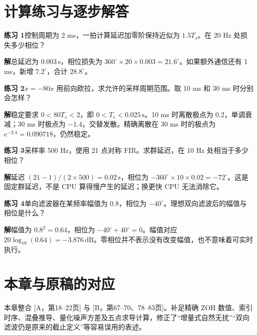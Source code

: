 \section{计算练习与逐步解答}

\textbf{练习 1}\quad 控制周期为 2 ms，一拍计算延迟加零阶保持近似为 $1.5T_s$。在 20 Hz 处损失多少相位？

\textbf{解}\quad 总延迟为 $0.003\,\mathrm{s}$，相位损失为 $360^\circ\times20\times0.003=21.6^\circ$。如果额外通信还有 1 ms，新增 $7.2^\circ$，合计 $28.8^\circ$。

\textbf{练习 2}\quad $\dot x=-80x$ 用前向欧拉，求允许的采样周期范围。取 10 ms 和 30 ms 时分别会怎样？

\textbf{解}\quad 稳定要求 $0<80T_s<2$，即 $0<T_s<0.025\,\mathrm{s}$。10 ms 时离散极点为 0.2，单调衰减；30 ms 时极点为 $-1.4$，交替发散。精确离散在 30 ms 时的极点为 $e^{-2.4}=0.090718$，仍然稳定。

\textbf{练习 3}\quad 采样率 500 Hz，使用 21 点对称 FIR。求群延迟，在 10 Hz 处相当于多少相位？

\textbf{解}\quad 延迟 $(21-1)/(2\times500)=0.02\,\mathrm{s}$，相位为 $-360^\circ\times10\times0.02=-72^\circ$。这是固定群延迟，不是 CPU 算得慢产生的延迟；换更快 CPU 无法消除它。

\textbf{练习 4}\quad 单向滤波器在某频率幅值为 0.8，相位为 $-40^\circ$。理想双向滤波后的幅值与相位是什么？

\textbf{解}\quad 幅值为 $0.8^2=0.64$，相位为 $-40^\circ+40^\circ=0$。幅值对应 $20\log_{10}(0.64)=-3.876\,\mathrm{dB}$。零相位并不表示没有改变幅值，也不意味着可实时执行。

\section*{本章与原稿的对应}
本章整合 [A，第18--22页] 与 [B，第67--70、78--83页]。补足精确 ZOH 数值、索引时序、混叠推导、量化噪声方差及五点求导计算，修正了“增量式自然无扰”“双向滤波仍是原来的截止定义”等容易误用的表述。
